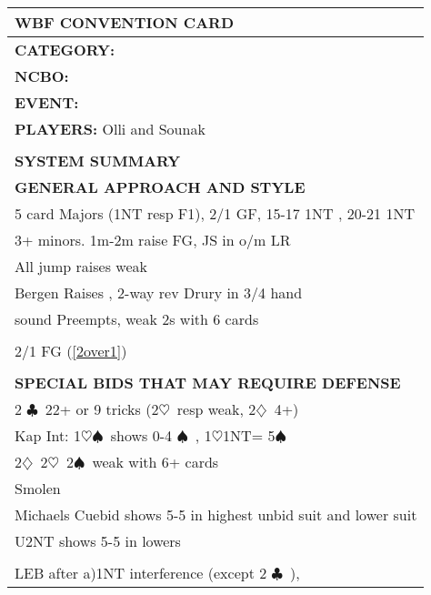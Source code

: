 \documentclass{article}
\newcommand\C{\ensuremath{\clubsuit}}
\newcommand\D{\ensuremath{\diamondsuit}}
\renewcommand\H{\ensuremath{\heartsuit}}
\renewcommand\S{\ensuremath{\spadesuit}}
\begin{document}
\begin{minipage}{5mm}
	\begin{tabular}{| p{5mm} |}
	\end{tabular}
\end{minipage}
\begin{minipage}{90mm}
	\begin{tabular}{| p{88mm} |}
		\hline
		\cellcolor[gray]{0.9} \textbf{WBF CONVENTION CARD} \\ \hline
		\textbf{CATEGORY:} \\
		\textbf{NCBO:} \\
		\textbf{EVENT:}  \\
		\textbf{PLAYERS:} Olli and Sounak \\
		\multirow{2}{*}{} \\
		\\
		\cellcolor[gray]{0.9} \textbf{SYSTEM SUMMARY} \\ \hline
		\textbf{GENERAL APPROACH AND STYLE} \\ \hline
                5 card Majors (1NT resp F1), 2/1 GF, 15-17 1NT , 20-21 1NT
                \\ \hline
                3+ minors. 1m-2m raise FG, JS in o/m LR
                \\ \hline
                All jump raises weak
		\\ \hline
                Bergen Raises , 2-way rev Drury in 3/4 hand
		\\ \hline 
                sound Preempts, weak 2s with 6 cards 
		\\ \hline
		\\ \hline
                2/1 FG (\ref{2over1})
		\\ \hline
		\\ \hline
		\textbf{SPECIAL BIDS THAT MAY REQUIRE DEFENSE} \\ \hline
                2 \C\ 22+ or 9 tricks (2\H\ resp weak, 2\D\ 4+)
		\\ \hline
                Kap Int: 1\H\-1\S\ shows 0-4 \S\ , 1\H\-1NT= 5\S\
		\\ \hline
                2\D\, 2\H\, 2\S\ weak with 6+ cards
		\\ \hline
                Smolen
		\\ \hline
                Michaels Cuebid shows 5-5 in highest unbid suit and lower suit
		\\ \hline
                U2NT shows 5-5 in lowers
		\\ \hline
		\\ \hline
            LEB after a)1NT interference (except 2 \C\ ), 

\end{tabular}
\end{minipage}
\end{document}
